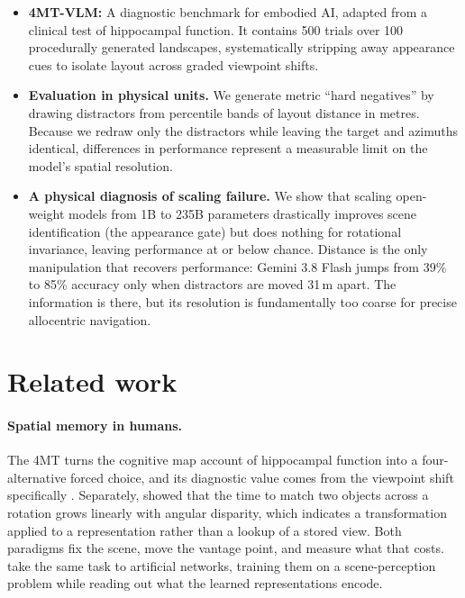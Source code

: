 \documentclass{article}
\begin{document}
\begin{itemize}\itemsep2pt
\item \textbf{4MT-VLM:} A diagnostic benchmark for embodied AI, adapted from a clinical test of hippocampal function. It contains 500 trials over 100 procedurally generated landscapes, systematically stripping away appearance cues to isolate layout across graded viewpoint shifts.
\item \textbf{Evaluation in physical units.} We generate metric ``hard negatives'' by drawing distractors from percentile bands of layout distance in metres. Because we redraw only the distractors while leaving the target and azimuths identical, differences in performance represent a measurable limit on the model's spatial resolution.
\item \textbf{A physical diagnosis of scaling failure.} We show that scaling open-weight models from 1B to 235B parameters drastically improves scene identification (the appearance gate) but does nothing for rotational invariance, leaving performance at or below chance. Distance is the only manipulation that recovers performance: Gemini 3.8 Flash jumps from 39\% to 85\% accuracy only when distractors are moved 31\,m apart. The information is there, but its resolution is fundamentally too coarse for precise allocentric navigation.
\end{itemize}

\section{Related work}

\paragraph{Spatial memory in humans.}
The 4MT turns the cognitive map account of hippocampal function \citep{okeefe1978hippocampus} into a four-alternative forced choice, and its diagnostic value comes from the viewpoint shift specifically
\citep{hartley2007hippocampus}. Separately, \citet{shepard1971mental} showed that the time to match two objects across a rotation grows linearly with angular disparity, which indicates a transformation applied to a representation rather than a lookup of a stored view. Both paradigms fix the scene, move the vantage point, and measure what that costs. \citet{frey2023probing} take the same task to artificial networks, training them on a scene-perception problem while reading out what the learned representations encode.
\end{document}
